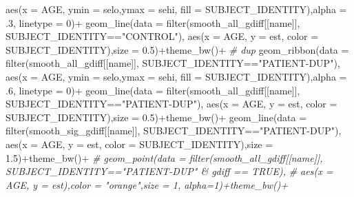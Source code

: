 \documentclass[
]{article}
\newenvironment{Shaded}{\begin{snugshade}}{\end{snugshade}}
\newcommand{\AttributeTok}[1]{\textcolor[rgb]{0.77,0.63,0.00}{#1}}
\newcommand{\CommentTok}[1]{\textcolor[rgb]{0.56,0.35,0.01}{\textit{#1}}}
\newcommand{\DecValTok}[1]{\textcolor[rgb]{0.00,0.00,0.81}{#1}}
\newcommand{\FloatTok}[1]{\textcolor[rgb]{0.00,0.00,0.81}{#1}}
\newcommand{\FunctionTok}[1]{\textcolor[rgb]{0.00,0.00,0.00}{#1}}
\newcommand{\NormalTok}[1]{#1}
\newcommand{\SpecialCharTok}[1]{\textcolor[rgb]{0.00,0.00,0.00}{#1}}
\newcommand{\StringTok}[1]{\textcolor[rgb]{0.31,0.60,0.02}{#1}}
\begin{document}
\begin{Shaded}
\begin{Highlighting}[]
                \FunctionTok{aes}\NormalTok{(}\AttributeTok{x =}\NormalTok{ AGE, }\AttributeTok{ymin =}\NormalTok{ selo,}\AttributeTok{ymax =}\NormalTok{ sehi, }\AttributeTok{fill =}\NormalTok{ SUBJECT\_IDENTITY),}\AttributeTok{alpha =}\NormalTok{ .}\DecValTok{3}\NormalTok{, }\AttributeTok{linetype =} \DecValTok{0}\NormalTok{)}\SpecialCharTok{+}
    \FunctionTok{geom\_line}\NormalTok{(}\AttributeTok{data =} \FunctionTok{filter}\NormalTok{(smooth\_all\_gdiff[[name]], SUBJECT\_IDENTITY}\SpecialCharTok{==}\StringTok{"CONTROL"}\NormalTok{),}
              \FunctionTok{aes}\NormalTok{(}\AttributeTok{x =}\NormalTok{ AGE, }\AttributeTok{y =}\NormalTok{ est, }\AttributeTok{color =}\NormalTok{ SUBJECT\_IDENTITY),}\AttributeTok{size =} \FloatTok{0.5}\NormalTok{)}\SpecialCharTok{+}\FunctionTok{theme\_bw}\NormalTok{()}\SpecialCharTok{+}
    \CommentTok{\# dup}
    \FunctionTok{geom\_ribbon}\NormalTok{(}\AttributeTok{data =} \FunctionTok{filter}\NormalTok{(smooth\_all\_gdiff[[name]], SUBJECT\_IDENTITY}\SpecialCharTok{==}\StringTok{"PATIENT{-}DUP"}\NormalTok{),}
                \FunctionTok{aes}\NormalTok{(}\AttributeTok{x =}\NormalTok{ AGE, }\AttributeTok{ymin =}\NormalTok{ selo,}\AttributeTok{ymax =}\NormalTok{ sehi, }\AttributeTok{fill =}\NormalTok{ SUBJECT\_IDENTITY),}\AttributeTok{alpha =}\NormalTok{ .}\DecValTok{6}\NormalTok{, }\AttributeTok{linetype =} \DecValTok{0}\NormalTok{)}\SpecialCharTok{+}
    \FunctionTok{geom\_line}\NormalTok{(}\AttributeTok{data =} \FunctionTok{filter}\NormalTok{(smooth\_all\_gdiff[[name]], SUBJECT\_IDENTITY}\SpecialCharTok{==}\StringTok{"PATIENT{-}DUP"}\NormalTok{),}
              \FunctionTok{aes}\NormalTok{(}\AttributeTok{x =}\NormalTok{ AGE, }\AttributeTok{y =}\NormalTok{ est, }\AttributeTok{color =}\NormalTok{ SUBJECT\_IDENTITY),}\AttributeTok{size =} \FloatTok{0.5}\NormalTok{)}\SpecialCharTok{+}\FunctionTok{theme\_bw}\NormalTok{()}\SpecialCharTok{+}
    \FunctionTok{geom\_line}\NormalTok{(}\AttributeTok{data =} \FunctionTok{filter}\NormalTok{(smooth\_sig\_gdiff[[name]], SUBJECT\_IDENTITY}\SpecialCharTok{==}\StringTok{"PATIENT{-}DUP"}\NormalTok{),}
              \FunctionTok{aes}\NormalTok{(}\AttributeTok{x =}\NormalTok{ AGE, }\AttributeTok{y =}\NormalTok{ est, }\AttributeTok{color =}\NormalTok{ SUBJECT\_IDENTITY),}\AttributeTok{size =} \FloatTok{1.5}\NormalTok{)}\SpecialCharTok{+}\FunctionTok{theme\_bw}\NormalTok{()}\SpecialCharTok{+}
    \CommentTok{\# geom\_point(data = filter(smooth\_all\_gdiff[[name]], SUBJECT\_IDENTITY=="PATIENT{-}DUP" \& gdiff == TRUE),}
    \CommentTok{\#           aes(x = AGE, y = est),color = "orange",size = 1, alpha=1)+theme\_bw()+}

\end{Highlighting}
\end{Shaded}
\end{document}
